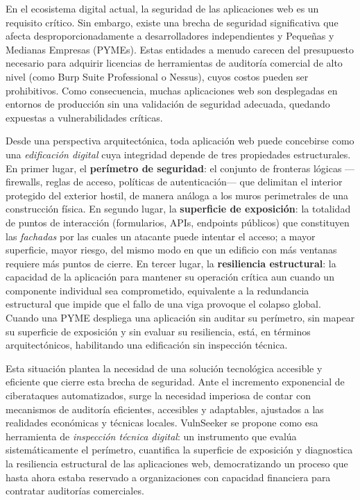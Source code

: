 \documentclass[12pt, a4paper]{article}
\begin{document}
En el ecosistema digital actual, la seguridad de las aplicaciones web es un
requisito crítico. Sin embargo, existe una brecha de seguridad significativa
que afecta desproporcionadamente a desarrolladores independientes y Pequeñas y
Medianas Empresas (PYMEs). Estas entidades a menudo carecen del presupuesto
necesario para adquirir licencias de herramientas de auditoría comercial de alto
nivel (como Burp Suite Professional o Nessus), cuyos costos pueden ser
prohibitivos. Como consecuencia, muchas aplicaciones web son desplegadas en
entornos de producción sin una validación de seguridad adecuada, quedando
expuestas a vulnerabilidades críticas.

Desde una perspectiva arquitectónica, toda aplicación web puede concebirse como
una \textit{edificación digital} cuya integridad depende de tres propiedades
estructurales. En primer lugar, el \textbf{perímetro de seguridad}: el conjunto
de fronteras lógicas ---firewalls, reglas de acceso, políticas de
autenticación--- que delimitan el interior protegido del exterior hostil, de
manera análoga a los muros perimetrales de una construcción física. En segundo
lugar, la \textbf{superficie de exposición}: la totalidad de puntos de
interacción (formularios, APIs, endpoints públicos) que constituyen las
\textit{fachadas} por las cuales un atacante puede intentar el acceso; a mayor
superficie, mayor riesgo, del mismo modo en que un edificio con más ventanas
requiere más puntos de cierre. En tercer lugar, la \textbf{resiliencia
estructural}: la capacidad de la aplicación para mantener su operación crítica
aun cuando un componente individual sea comprometido, equivalente a la
redundancia estructural que impide que el fallo de una viga provoque el colapso
global. Cuando una PYME despliega una aplicación sin auditar su perímetro, sin
mapear su superficie de exposición y sin evaluar su resiliencia, está, en
términos arquitectónicos, habilitando una edificación sin inspección técnica.

Esta situación plantea la necesidad de una solución tecnológica accesible y
eficiente que cierre esta brecha de seguridad. Ante el incremento exponencial de
ciberataques automatizados, surge la necesidad imperiosa de contar con mecanismos
de auditoría eficientes, accesibles y adaptables, ajustados a las realidades
económicas y técnicas locales. VulnSeeker se propone como esa herramienta de
\textit{inspección técnica digital}: un instrumento que evalúa sistemáticamente
el perímetro, cuantifica la superficie de exposición y diagnostica la resiliencia
estructural de las aplicaciones web, democratizando un proceso que hasta ahora
estaba reservado a organizaciones con capacidad financiera para contratar
auditorías comerciales.
\end{document}
